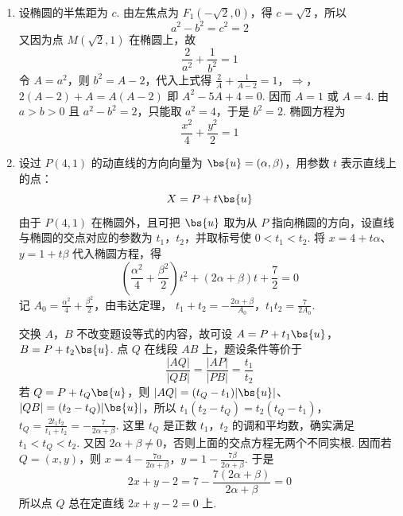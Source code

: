 \begin{solution}
\begin{enumerate}
\item 设椭圆的半焦距为 \(c\). 由左焦点为 \(F_1(-\sqrt2,0)\)，得 \(c=\sqrt2\)，所以
\[
a^2-b^2=c^2=2
\]
又因为点 \(M(\sqrt2,1)\) 在椭圆上，故
\[
\frac{2}{a^2}+\frac{1}{b^2}=1
\]
令 \(A=a^2\)，则 \(b^2=A-2\)，代入上式得
\(\frac2A+\frac1{A-2}=1\)，\(\Longrightarrow\)，\(2(A-2)+A=A(A-2)\)
即 \(A^2-5A+4=0\). 因而 \(A=1\) 或 \(A=4\). 由 \(a>b>0\) 且 \(a^2-b^2=2\)，只能取 \(a^2=4\)，于是 \(b^2=2\). 椭圆方程为
\[
\frac{x^2}{4}+\frac{y^2}{2}=1
\]

\item 设过 \(P(4,1)\) 的动直线的方向向量为 \(\bs{u}=(\alpha,\beta)\)，用参数 \(t\) 表示直线上的点：
\[
X=P+t\bs{u}
\]
由于 \(P(4,1)\) 在椭圆外，且可把 \(\bs{u}\) 取为从 \(P\) 指向椭圆的方向，设直线与椭圆的交点对应的参数为 \(t_1\)，\(t_2\)，并取标号使 \(0<t_1<t_2\). 将 \(x=4+t\alpha\)、\(y=1+t\beta\) 代入椭圆方程，得
\[
\left(\frac{\alpha^2}{4}+\frac{\beta^2}{2}\right)t^2+(2\alpha+\beta)t+\frac72=0
\]
记 \(A_0=\frac{\alpha^2}{4}+\frac{\beta^2}{2}\)，由韦达定理，
\(t_1+t_2=-\frac{2\alpha+\beta}{A_0}\)，\(t_1t_2=\frac{7}{2A_0}\).

交换 \(A\)，\(B\) 不改变题设等式的内容，故可设 \(A=P+t_1\bs{u}\)，\(B=P+t_2\bs{u}\). 点 \(Q\) 在线段 \(AB\) 上，题设条件等价于
\[
\frac{|AQ|}{|QB|}=\frac{|AP|}{|PB|}=\frac{t_1}{t_2}
\]
若 \(Q=P+t_Q\bs{u}\)，则 \(|AQ|=(t_Q-t_1)|\bs{u}|\)、\(|QB|=(t_2-t_Q)|\bs{u}|\)，所以
\(t_1(t_2-t_Q)=t_2(t_Q-t_1)\)，\(t_Q=\frac{2t_1t_2}{t_1+t_2}=-\frac7{2\alpha+\beta}\).
这里 \(t_Q\) 是正数 \(t_1\)，\(t_2\) 的调和平均数，确实满足 \(t_1<t_Q<t_2\). 又因 \(2\alpha+\beta\neq0\)，否则上面的交点方程无两个不同实根. 因而若 \(Q=(x,y)\)，则
\(x=4-\frac{7\alpha}{2\alpha+\beta}\)，\(y=1-\frac{7\beta}{2\alpha+\beta}\).
于是
\[
2x+y-2=7-\frac{7(2\alpha+\beta)}{2\alpha+\beta}=0
\]
所以点 \(Q\) 总在定直线 \(2x+y-2=0\) 上.
\end{enumerate}
\end{solution}

